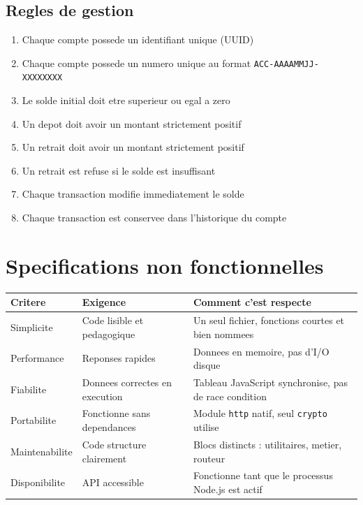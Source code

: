 \documentclass[12pt,a4paper]{article}
\begin{document}
\subsection{Regles de gestion}

\begin{enumerate}[noitemsep]
  \item Chaque compte possede un identifiant unique (UUID)
  \item Chaque compte possede un numero unique au format \texttt{ACC-AAAAMMJJ-XXXXXXXX}
  \item Le solde initial doit etre superieur ou egal a zero
  \item Un depot doit avoir un montant strictement positif
  \item Un retrait doit avoir un montant strictement positif
  \item Un retrait est refuse si le solde est insuffisant
  \item Chaque transaction modifie immediatement le solde
  \item Chaque transaction est conservee dans l'historique du compte
\end{enumerate}

\section{Specifications non fonctionnelles}

\begin{center}
\begin{tabular}{lp{5cm}p{6cm}}
\toprule
\textbf{Critere} & \textbf{Exigence} & \textbf{Comment c'est respecte} \\
\midrule
Simplicite & Code lisible et pedagogique & Un seul fichier, fonctions courtes et bien nommees \\
Performance & Reponses rapides & Donnees en memoire, pas d'I/O disque \\
Fiabilite & Donnees correctes en execution & Tableau JavaScript synchronise, pas de race condition \\
Portabilite & Fonctionne sans dependances & Module \texttt{http} natif, seul \texttt{crypto} utilise \\
Maintenabilite & Code structure clairement & Blocs distincts : utilitaires, metier, routeur \\
Disponibilite & API accessible & Fonctionne tant que le processus Node.js est actif \\
\bottomrule
\end{tabular}
\end{center}
\end{document}
